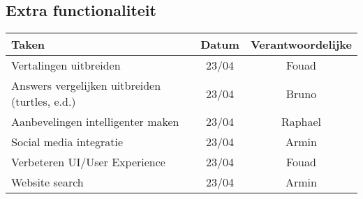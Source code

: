 \subsection{Extra functionaliteit}
\begin{tabular}{| l | c | c |}
    \hline
    Taken   &   Datum   &   Verantwoordelijke \\
    \hline \hline
    Vertalingen uitbreiden  &   23/04   &   Fouad   \\
    Answers vergelijken uitbreiden (turtles, e.d.)  &   23/04   &   Bruno   \\
    Aanbevelingen intelligenter maken   &   23/04   &   Raphael \\
    Social media integratie   &   23/04   &   Armin  \\
    Verbeteren UI/User Experience    &   23/04   &   Fouad \\
    Website search    &   23/04   &   Armin   \\
    \hline
\end{tabular}
